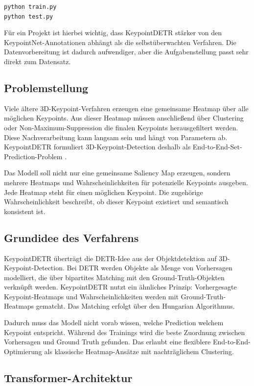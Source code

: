 \documentclass[11pt,a4paper]{article}
\begin{document}
\begin{lstlisting}
python train.py
python test.py
\end{lstlisting}

Für ein Projekt ist hierbei wichtig, dass KeypointDETR stärker von den KeypointNet-Annotationen abhängt als die selbstüberwachten Verfahren. Die Datenvorbereitung ist dadurch aufwendiger, aber die Aufgabenstellung passt sehr direkt zum Datensatz.

\subsection{Problemstellung}

Viele ältere 3D-Keypoint-Verfahren erzeugen eine gemeinsame Heatmap über alle möglichen Keypoints. Aus dieser Heatmap müssen anschließend über Clustering oder Non-Maximum-Suppression die finalen Keypoints herausgefiltert werden. Diese Nachverarbeitung kann langsam sein und hängt von Parametern ab. KeypointDETR formuliert 3D-Keypoint-Detection deshalb als End-to-End-Set-Prediction-Problem \cite{jin2024keypointdetr}.

Das Modell soll nicht nur eine gemeinsame Saliency Map erzeugen, sondern mehrere Heatmaps und Wahrscheinlichkeiten für potenzielle Keypoints ausgeben. Jede Heatmap steht für einen möglichen Keypoint. Die zugehörige Wahrscheinlichkeit beschreibt, ob dieser Keypoint existiert und semantisch konsistent ist.

\subsection{Grundidee des Verfahrens}

KeypointDETR überträgt die DETR-Idee aus der Objektdetektion auf 3D-Keypoint-Detection. Bei DETR werden Objekte als Menge von Vorhersagen modelliert, die über bipartites Matching mit den Ground-Truth-Objekten verknüpft werden. KeypointDETR nutzt ein ähnliches Prinzip: Vorhergesagte Keypoint-Heatmaps und Wahrscheinlichkeiten werden mit Ground-Truth-Heatmaps gematcht. Das Matching erfolgt über den Hungarian Algorithmus.

Dadurch muss das Modell nicht vorab wissen, welche Prediction welchem Keypoint entspricht. Während des Trainings wird die beste Zuordnung zwischen Vorhersagen und Ground Truth gefunden. Das erlaubt eine flexiblere End-to-End-Optimierung als klassische Heatmap-Ansätze mit nachträglichem Clustering.

\subsection{Transformer-Architektur}
\end{document}
